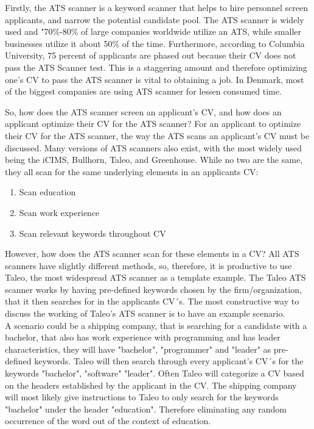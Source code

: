 Firstly, the ATS scanner is a keyword scanner that helps to hire personnel screen applicants, and narrow the potential candidate pool.
The ATS scanner is widely used and "70\%-80\% of large companies worldwide utilize an ATS, while smaller businesses utilize it about 50\% of the time.\cite{ATS_Usage}
Furthermore, according to Columbia University, 75 percent of applicants are phased out because their CV does not pass the ATS Scanner test.
This is a staggering amount and therefore optimizing one's CV to pass the ATS scanner is vital to obtaining a job.
In Denmark, most of the biggest companies are using ATS scanner for lessen consumed time.\cite{ATS_Denmark}

So, how does the ATS scanner screen an applicant's CV, and how does an applicant optimize their CV for the ATS scanner?
For an applicant to optimize their CV for the ATS scanner, the way the ATS scans an applicant's CV must be discussed.
Many versions of ATS scanners also exist, with the most widely used being the iCIMS, Bullhorn, Taleo, and Greenhouse.
While no two are the same, they all scan for the same underlying elements in an applicants CV:
\begin{enumerate}
   \item Scan education
   \item Scan work experience
   \item Scan relevant keywords throughout CV
\end{enumerate}
However, how does the ATS scanner scan for these elements in a CV?
All ATS scanners have slightly different methods, so, therefore, it is productive to use Taleo, the most widespread ATS scanner as a template example.
The Taleo ATS scanner works by having pre-defined keywords chosen by the firm/organization, that it then searches for in the applicants CV´s.\cite{ATS_Taleo}
The most constructive way to discuss the working of Taleo's ATS scanner is to have an example scenario. \\

A scenario could be a shipping company, that is searching for a candidate with a bachelor, that also has work experience with programming and has leader characteristics, they will have "bachelor", "programmer" and "leader" as pre-defined keywords.
Taleo will then search through every applicant's CV´s for the keywords "bachelor", "software" "leader".\cite{ATS_Purpose_Workings}
Often Taleo will categorize a CV based on the headers established by the applicant in the CV.
The shipping company will most likely give instructions to Taleo to only search for the keywords "bachelor" under the header "education".
Therefore eliminating any random occurrence of the word out of the context of education. \\

